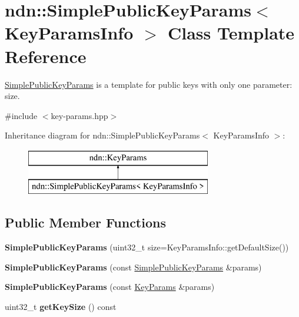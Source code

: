 \hypertarget{classndn_1_1SimplePublicKeyParams}{}\section{ndn\+:\+:Simple\+Public\+Key\+Params$<$ Key\+Params\+Info $>$ Class Template Reference}
\label{classndn_1_1SimplePublicKeyParams}


\hyperlink{classndn_1_1SimplePublicKeyParams}{Simple\+Public\+Key\+Params} is a template for public keys with only one parameter\+: size.  




{\ttfamily \#include $<$key-\/params.\+hpp$>$}

Inheritance diagram for ndn\+:\+:Simple\+Public\+Key\+Params$<$ Key\+Params\+Info $>$\+:\begin{figure}[H]
\begin{center}
\leavevmode
\includegraphics[height=2.000000cm]{classndn_1_1SimplePublicKeyParams}
\end{center}
\end{figure}
\subsection*{Public Member Functions}
\begin{DoxyCompactItemize}
\item 
{\bfseries Simple\+Public\+Key\+Params} (uint32\+\_\+t size=Key\+Params\+Info\+::get\+Default\+Size())\hypertarget{classndn_1_1SimplePublicKeyParams_a29f3a2740e1da68511269c3d4abfaecd}{}\label{classndn_1_1SimplePublicKeyParams_a29f3a2740e1da68511269c3d4abfaecd}

\item 
{\bfseries Simple\+Public\+Key\+Params} (const \hyperlink{classndn_1_1SimplePublicKeyParams}{Simple\+Public\+Key\+Params} \&params)\hypertarget{classndn_1_1SimplePublicKeyParams_a26703dc3b134f0b971b121c380d7b16d}{}\label{classndn_1_1SimplePublicKeyParams_a26703dc3b134f0b971b121c380d7b16d}

\item 
{\bfseries Simple\+Public\+Key\+Params} (const \hyperlink{classndn_1_1KeyParams}{Key\+Params} \&params)\hypertarget{classndn_1_1SimplePublicKeyParams_ada745e769488957392f7ff84681a9371}{}\label{classndn_1_1SimplePublicKeyParams_ada745e769488957392f7ff84681a9371}

\item 
uint32\+\_\+t {\bfseries get\+Key\+Size} () const\hypertarget{classndn_1_1SimplePublicKeyParams_ab5b39d2ecd933d022f9cd9e71161c8dd}{}\label{classndn_1_1SimplePublicKeyParams_ab5b39d2ecd933d022f9cd9e71161c8dd}

\end{DoxyCompactItemize}
